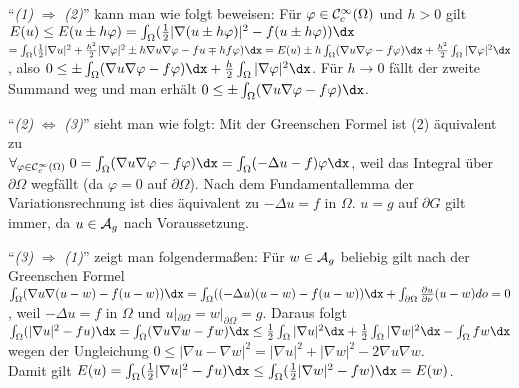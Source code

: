 \begin{Bem}
    "`\emph{(1)} $\Rightarrow$ \emph{(2)}"' kann man wie folgt beweisen:
    Für $\varphi \in \mathcal{C}^\infty_c(\Omega)$ und $h > 0$ gilt\\
    $E(u) \le E(u \pm h\varphi)
    = \int_\Omega (\frac{1}{2} |\nabla (u \pm h\varphi)|^2 - f(u \pm h\varphi)) \dx$\\
    $= \int_\Omega (\frac{1}{2} |\nabla u|^2 + \frac{h^2}{2} |\nabla \varphi|^2 \pm
    h \nabla u \nabla \varphi - fu \mp h f\varphi) \dx
    = E(u) \pm h \int_\Omega (\nabla u \nabla \varphi - f\varphi) \dx +
    \frac{h^2}{2} \int_\Omega |\nabla \varphi|^2 \dx$,
    also $0 \le \pm\int_\Omega (\nabla u \nabla \varphi - f\varphi) \dx +
    \frac{h}{2} \int_\Omega |\nabla \varphi|^2 \dx$.
    Für $h \to 0$ fällt der zweite Summand weg und man erhält
    $0 \le \pm\int_\Omega (\nabla u \nabla \varphi - f\varphi) \dx$.
    
    "`\emph{(2)} $\iff$ \emph{(3)}"' sieht man wie folgt:
    Mit der Greenschen Formel ist (2) äquivalent zu\\
    $\forall_{\varphi \in \C^\infty_c(\Omega)}\;
    0 = \int_\Omega (\nabla u \nabla \varphi - f\varphi) \dx
    = \int_\Omega (-\Delta u - f) \varphi \dx$, weil das Integral über $\partial \Omega$
    wegfällt (da $\varphi = 0$ auf $\partial \Omega$).
    Nach dem Fundamentallemma der Variationsrechnung ist dies äquivalent zu $-\Delta u = f$
    in $\Omega$.
    $u = g$ auf $\partial G$ gilt immer, da $u \in \mathcal{A}_g$ nach Voraussetzung.
    
    "`\emph{(3)} $\Rightarrow$ \emph{(1)}"' zeigt man folgendermaßen:
    Für $w \in \mathcal{A}_g$ beliebig gilt nach der Greenschen Formel
    $\int_\Omega (\nabla u \nabla (u - w) - f(u - w))\dx
    = \int_\Omega ((-\Delta u)(u - w) - f(u - w)) \dx +
    \int_{\partial\Omega} \frac{\partial u}{\partial \nu} (u - w) do = 0$,
    weil $-\Delta u = f$ in $\Omega$ und $u|_{\partial\Omega} = w|_{\partial\Omega} = g$.
    Daraus folgt\\
    $\int_\Omega (|\nabla u|^2 - fu) \dx
    = \int_\Omega (\nabla u \nabla w - fw) \dx
    \le \frac{1}{2} \int_\Omega |\nabla u|^2 \dx + \frac{1}{2} \int_\Omega |\nabla w|^2 \dx -
    \int_\Omega fw \dx$ wegen der Ungleichung
    $0 \le |\nabla u - \nabla w|^2 = |\nabla u|^2 + |\nabla w|^2 - 2 \nabla u \nabla w$.\\
    Damit gilt
    $E(u) = \int_\Omega (\frac{1}{2} |\nabla u|^2 - fu) \dx \le
    \int_\Omega (\frac{1}{2} |\nabla w|^2 - fw) \dx = E(w)$.
\end{Bem}

